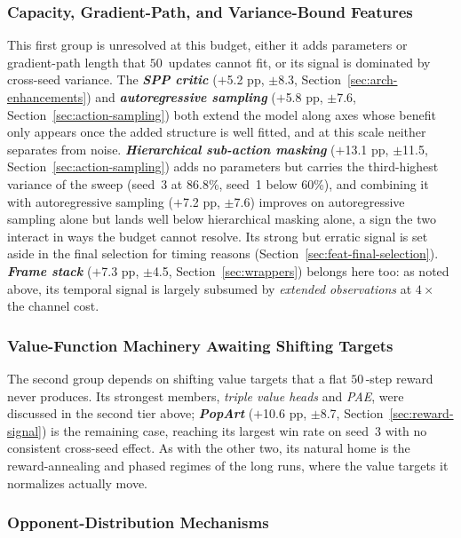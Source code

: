 \subsubsection{Capacity, Gradient-Path, and Variance-Bound Features}

This first group is unresolved at this budget, either it adds parameters or gradient-path length that $50$\, updates cannot fit, or its signal is dominated by cross-seed variance. The \emph{\textbf{SPP critic}} ($+$5.2 pp, $\pm$8.3, Section~\ref{sec:arch-enhancements}) and \emph{\textbf{autoregressive sampling}} ($+$5.8 pp, $\pm$7.6, Section~\ref{sec:action-sampling}) both extend the model along axes whose benefit only appears once the added structure is well fitted, and at this scale neither separates from noise. \emph{\textbf{Hierarchical sub-action masking}} ($+$13.1 pp, $\pm$11.5, Section~\ref{sec:action-sampling}) adds no parameters but carries the third-highest variance of the sweep (seed~3 at $86.8$\%, seed~1 below $60$\%), and combining it with autoregressive sampling ($+$7.2 pp, $\pm$7.6) improves on autoregressive sampling alone but lands well below hierarchical masking alone, a sign the two interact in ways the budget cannot resolve. Its strong but erratic signal is set aside in the final selection for timing reasons (Section~\ref{sec:feat-final-selection}). \emph{\textbf{Frame stack}} ($+$7.3 pp, $\pm$4.5, Section~\ref{sec:wrappers}) belongs here too: as noted above, its temporal signal is largely subsumed by \emph{extended observations} at $4\times$ the channel cost.

\subsubsection{Value-Function Machinery Awaiting Shifting Targets}

The second group depends on shifting value targets that a flat $50$\,-step reward never produces. Its strongest members, \emph{triple value heads} and \emph{PAE}, were discussed in the second tier above; \emph{\textbf{PopArt}} ($+$10.6 pp, $\pm$8.7, Section~\ref{sec:reward-signal}) is the remaining case, reaching its largest win rate on seed~$3$ with no consistent cross-seed effect. As with the other two, its natural home is the reward-annealing and phased regimes of the long runs, where the value targets it normalizes actually move.

\subsubsection{Opponent-Distribution Mechanisms}

